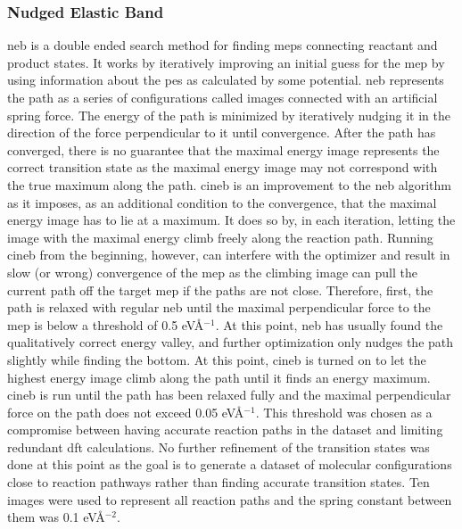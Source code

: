 \documentclass[twoside,twocolumn]{article}
\begin{document}
\subsubsection*{Nudged Elastic Band}
\gls{neb}\cite{neb} is a double ended search method for finding \glspl{mep} connecting reactant and product states. It works by iteratively improving an initial guess for the \gls{mep} by using information about the \gls{pes} as calculated by some potential. \gls{neb} represents the path as a series of configurations called images connected with an artificial spring force. The energy of the path is minimized by iteratively nudging it in the direction of the force perpendicular to it until convergence. After the path has converged, there is no guarantee that the maximal energy image represents the correct transition state as the maximal energy image may not correspond with the true maximum along the path. \gls{cineb}\cite{cineb} is an improvement to the \gls{neb} algorithm as it imposes, as an additional condition to the convergence, that the maximal energy image has to lie at a maximum. It does so by, in each iteration, letting the image with the maximal energy climb freely along the reaction path. Running \gls{cineb} from the beginning, however, can interfere with the optimizer and result in slow (or wrong) convergence of the \gls{mep} as the climbing image can pull the current path off the target \gls{mep} if the paths are not close. Therefore, first, the path is relaxed with regular \gls{neb} until the maximal perpendicular force to the \gls{mep} is below a threshold of 0.5 eVÅ$^{-1}$. At this point, \gls{neb} has usually found the qualitatively correct energy valley, and further optimization only nudges the path slightly while finding the bottom. At this point, \gls{cineb} is turned on to let the highest energy image climb along the path until it finds an energy maximum. \gls{cineb} is run until the path has been relaxed fully and the maximal perpendicular force on the path does not exceed 0.05 eVÅ$^{-1}$. This threshold was chosen as a compromise between having accurate reaction paths in the dataset and limiting redundant \gls{dft} calculations. No further refinement of the transition states was done at this point as the goal is to generate a dataset of molecular configurations close to reaction pathways rather than finding accurate transition states. Ten images were used to represent all reaction paths and the spring constant between them was 0.1 eVÅ$^{-2}$. 
\end{document}
